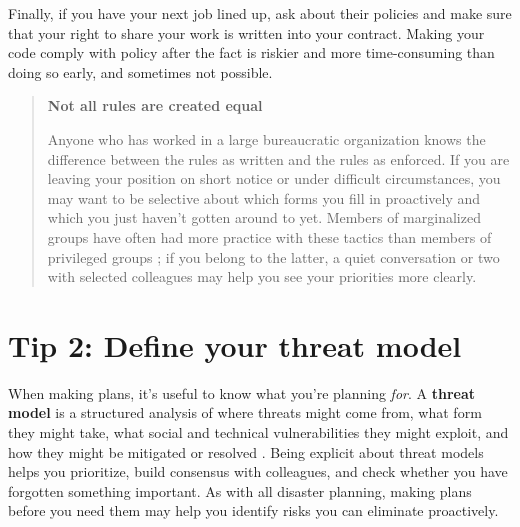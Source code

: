 \documentclass[10pt,letterpaper]{article}
\begin{document}
Finally, if you have your next job lined up, ask about their policies and make sure that your right to share your work is written into your contract. 
Making your code comply with policy after the fact is riskier and more time-consuming than doing so early,
and sometimes not possible.

\begin{quote}
  \noindent
  \textbf{Not all rules are created equal}

  Anyone who has worked in a large bureaucratic organization knows
  the difference between the rules as written and the rules as enforced.
  If you are leaving your position on short notice or under difficult circumstances, you may want to be selective about which forms you fill in proactively and which you just haven't gotten around to yet.
  Members of marginalized groups have often had more practice with these tactics
  than members of privileged groups \cite{Scott1987}; if you belong to the latter, a quiet conversation or two with selected colleagues may help you see your priorities more clearly.
\end{quote}

\section*{Tip 2: Define your threat model}

When making plans, it's useful to know what you're planning \emph{for}.
A \textbf{threat model} is a structured analysis of where threats might come from,
what form they might take, what social and technical vulnerabilities they might exploit,
and how they might be mitigated or resolved \cite{Torr2005}.
Being explicit about threat models helps you prioritize,
build consensus with colleagues, and check whether you have forgotten something important.
As with all disaster planning, making plans before you need them may help you identify risks you can eliminate proactively.
\end{document}
